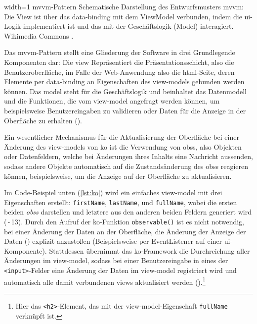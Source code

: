 	{width=1\textwidth}
	{\gls{mvvm}-Pattern}
		{Schematische Darstellung des Entwurfsmusters \gls{mvvm}: Die View ist über das \gls{data-binding} mit dem ViewModel verbunden, indem die \gls{ui}-Logik implementiert ist und das mit der Geschäftslogik (Model) interagiert.}
	{Wikimedia Commons \cite{MVVMPattern}.}


Das \gls{mvvm}-Pattern stellt eine Gliederung der Software in drei Grundlegende Komponenten dar:
Die \gls{view} Repräsentiert die Präsentationsschicht, also die Benutzeroberfläche, im Falle der Web-Anwendung also die \gls{html}-Seite, deren Elemente per \gls{data-binding} an Eigenschaften des \glspl{view-model} gebunden werden können. 
Das \gls{model} steht für die Geschäftslogik und beinhaltet das Datenmodell und die Funktionen, die vom \gls{view-model} angefragt werden können, um beispielsweise Benutzereingaben zu validieren oder Daten für die Anzeige in der Oberfläche zu erhalten ().

Ein wesentlicher Mechanismus für die Aktualisierung der Oberfläche bei einer Änderung des \glspl{view-model} von \gls{ko} ist die Verwendung von \glspl{obs}, also Objekten oder Datenfeldern, welche bei Änderungen ihres Inhalts eine Nachricht aussenden, sodass andere Objekte automatisch auf die Zustandsänderung des \glspl{obs} reagieren können, beispielsweise, um die Anzeige auf der Oberfläche zu aktualisieren.

Im Code-Beispiel unten (\autoref{lst:ko}) wird ein einfaches \gls{view-model} mit drei Eigenschaften erstellt: \lstinline|firstName|, \lstinline|lastName|, und \lstinline|fullName|, wobei die ersten beiden \emph{\glspl{obs}} darstellen und letztere aus den anderen beiden Feldern generiert wird (\,-\,13).
Durch den Aufruf der \gls{ko}-Funktion \lstinline|observable()| ist es nicht notwendig, bei einer Änderung der Daten an der Oberfläche, die Änderung der Anzeige der Daten () explizit anzustoßen (Beispielsweise per EventListener auf einer \gls{ui}-Komponente).
Stattdessen übernimmt das \gls{ko}-Framework die Durchreichung aller Änderungen im \gls{view-model}, sodass bei einer Benutzereingabe in eines der \lstinline|<input>|-Felder eine Änderung der Daten im \gls{view-model} registriert wird und automatisch alle damit verbundenen \glspl{view} aktualisiert werden ().\footnote{Hier das \texttt{<h2>}-Element, das mit der \gls{view-model}-Eigenschaft \texttt{fullName} verknüpft ist.}




